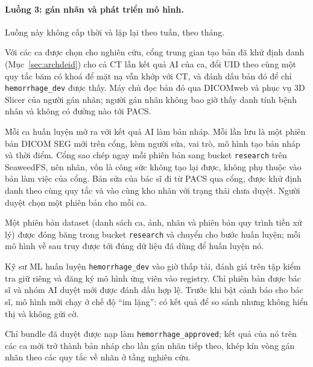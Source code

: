 \paragraph{Luồng 3: gán nhãn và phát triển mô hình.} Luồng này không cấp thời và lặp
lại theo tuần, theo tháng.
\begin{description}[leftmargin=1.2cm,style=nextline]
\item[3.1] Với các ca được chọn cho nghiên cứu, cổng trung gian tạo bản đã khử định
      danh (Mục~\ref{sec:archdeid}) cho cả CT lẫn kết quả AI của ca, đổi UID theo cùng một
      quy tắc băm có khoá để mặt nạ vẫn khớp với CT, và đánh dấu bản đó để chỉ
      \texttt{hemorrhage\_dev} được thấy. Máy chủ đọc bản đó qua DICOMweb và phục vụ 3D Slicer của người gán nhãn; người gán nhãn không bao giờ thấy danh
      tính bệnh nhân và không có đường nào tới PACS.
\item[3.2] Mỗi ca huấn luyện mở ra với kết quả AI làm bản nháp. Mỗi lần lưu là một
      phiên bản DICOM SEG mới trên cổng, kèm người sửa, vai trò, mô hình tạo bản nháp và
      thời điểm. Cổng sao chép ngay mỗi phiên bản sang bucket \texttt{research} trên
      SeaweedFS, nên nhãn, vốn là công sức không tạo lại được, không phụ thuộc vào bản làm
      việc của cổng. Bản sửa của bác sĩ đi từ PACS qua cổng, được khử định danh theo cùng
      quy tắc và vào cùng kho nhãn với trạng thái chưa duyệt. Người duyệt chọn một phiên
      bản cho mỗi ca.
\item[3.3] Một phiên bản dataset (danh sách ca, ảnh, nhãn và phiên bản quy trình tiền
      xử lý) được đóng băng trong bucket \texttt{research} và chuyển cho bước huấn luyện;
      mỗi mô hình về sau truy được tới đúng dữ liệu đã dùng để huấn luyện nó.
\item[3.4] Kỹ sư ML huấn luyện \texttt{hemorrhage\_dev} vào giờ thấp tải, đánh giá trên tập kiểm tra giữ riêng và đăng ký mô hình
      ứng viên vào registry. Chỉ phiên bản được bác sĩ và nhóm AI duyệt mới được đánh dấu
      hợp lệ. Trước khi bật cảnh báo cho bác sĩ, mô hình mới chạy ở chế độ ``im lặng'': có
      kết quả để so sánh nhưng không hiển thị và không gửi cờ.
\item[3.5] Chỉ bundle đã duyệt được nạp làm \texttt{hemorrhage\_approved}; kết quả của nó trên các
      ca mới trở thành bản nháp cho lần gán nhãn tiếp theo, khép kín vòng gán nhãn theo
      các quy tắc về nhãn ở tầng nghiên cứu.
\end{description}

